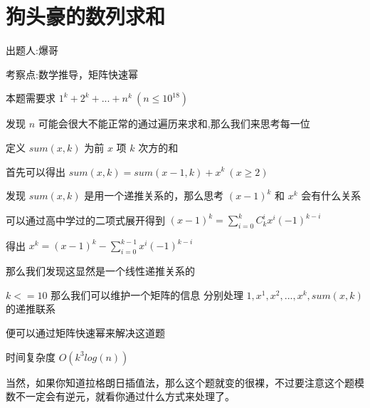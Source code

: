 \documentclass[12pt, a4paper, oneside]{ctexart}
\begin{document}
\section{狗头豪的数列求和} 
出题人:爆哥 \par 
考察点:数学推导，矩阵快速幂 \par 
本题需要求 $1^k+2^k+...+n^k\ (n\leq10^{18})$ \par 
\hspace*{\fill} \par
发现 $n$ 可能会很大不能正常的通过遍历来求和,那么我们来思考每一位 \par 
\hspace*{\fill} \par
定义 $sum(x,k)$ 为前 $x$ 项 $k$ 次方的和 \par 
\hspace*{\fill} \par
首先可以得出 $sum(x,k)=sum(x-1,k)+x^k \ (x\geq2)$ \par 
\hspace*{\fill} \par
发现 $sum(x,k)$ 是用一个递推关系的，那么思考 $(x-1)^k$ 和 $x^k$ 会有什么关系  \par 
\hspace*{\fill} \par
可以通过高中学过的二项式展开得到 $(x-1)^k=\sum_{i=0}^kC_k^ix^i(-1)^{k-i}$ \par 
\hspace*{\fill} \par
得出 $x^k=(x-1)^k-\sum_{i=0}^{k-1}x^i(-1)^{k-i}$ \par 
\hspace*{\fill} \par
那么我们发现这显然是一个线性递推关系的 \par 
\hspace*{\fill} \par
$k<=10$ 那么我们可以维护一个矩阵的信息 分别处理 $1,x^1,x^2,...,x^k,sum(x,k)$ 的递推联系 \par 
\hspace*{\fill} \par
便可以通过矩阵快速幂来解决这道题 \par 
\hspace*{\fill} \par
时间复杂度 $O(k^3log(n))$ \par 
\hspace*{\fill} \par
当然，如果你知道拉格朗日插值法，那么这个题就变的很裸，不过要注意这个题模数不一定会有逆元，就看你通过什么方式来处理了。 \par
\end{document}
